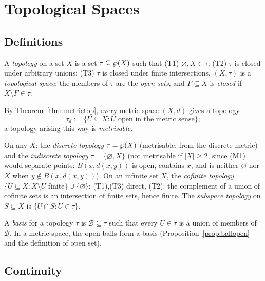 \chapter{Topological Spaces}\label{ch:topspaces}

\section{Definitions}

\begin{definition}[Topology]
	A \emph{topology} on a set $X$ is a set $\tau\subseteq\wp(X)$ such that (T1) $\varnothing,X\in\tau$; (T2) $\tau$ is closed under arbitrary unions; (T3) $\tau$ is closed under finite intersections. $(X,\tau)$ is a \emph{topological space}; the members of $\tau$ are the \emph{open sets}, and $F\subseteq X$ is \emph{closed} if $X\setminus F\in\tau$.
\end{definition}

By Theorem~\ref{thm:metrictop}, every metric space $(X,d)$ gives a topology
\[
\tau_d:=\{U\subseteq X:U\text{ open in the metric sense}\};
\]
a topology arising this way is \emph{metrisable}.

\begin{example}
	On any $X$: the \emph{discrete topology} $\tau=\wp(X)$ (metrisable, from the discrete metric) and the \emph{indiscrete topology} $\tau=\{\varnothing,X\}$ (not metrisable if $|X|\ge2$, since (M1) would separate points: $B(x,d(x,y))$ is open, contains $x$, and is neither $\varnothing$ nor $X$ when $y\notin B(x,d(x,y))$). On an infinite set $X$, the \emph{cofinite topology} $\{U\subseteq X:X\setminus U\text{ finite}\}\cup\{\varnothing\}$: (T1),(T3) direct, (T2): the complement of a union of cofinite sets is an intersection of finite sets, hence finite. The \emph{subspace topology} on $S\subseteq X$ is $\{U\cap S:U\in\tau\}$.
\end{example}

\begin{definition}[Basis]
	A \emph{basis} for a topology $\tau$ is $\mathcal B\subseteq\tau$ such that every $U\in\tau$ is a union of members of $\mathcal B$. In a metric space, the open balls form a basis (Proposition~\ref{prop:ballopen} and the definition of open set).
\end{definition}

\section{Continuity}

